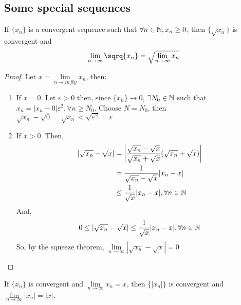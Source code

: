\subsection{Some special sequences}

\begin{theorem}
    If $\{x_n\}$ is a convergent sequence such that $\forall n \in \mathbb{N}, x_n \geq 0$, then $\{\sqrt{x_n}\}$ is convergent and
    \begin{equation}
        \lim \limits_{n \to \infty} \sqrq{x_n} = \sqrt{\lim \limits_{n \to \infty} x_n}
    \end{equation}
\end{theorem}

\begin{proof}
    Let $x = \lim \limits_{n \to infty} x_n$, then:
    \begin{enumerate}
        \item If $x = 0$. Let $\varepsilon > 0$ then, since $\{x_n\} \to 0$, $\exists N_0 \in \mathbb{N}$ such that $x_n = |x_n-0| \varepsilon^2, \forall n \geq N_0$. Choose $N = N_0$, then $\sqrt{x_n}-\sqrt{0} = \sqrt{x_n} < \sqrt{\varepsilon^2} = \varepsilon$
        \item If $ x > 0$. Then, 
        \begin{equation*}
            \begin{align}
                |\sqrt{x_n} - \sqrt{x}| &= \left |
                    \frac{\sqrt{x_n}-\sqrt{x}}{\sqrt{x_n}+\sqrt{x}}(\sqrt{x_n}+\sqrt{x})
                \right | \\
                &= \frac{1}{\sqrt{x_n} - \sqrt{x}}|x_n-x| \\
                &\leq \frac{1}{\sqrt{x}}|x_n-x|, \forall n \in \mathbb{N}
            \end{align}
        \end{equation*}
        And,
        \begin{equation*}
            0 \leq |\sqrt{x_n}-\sqrt{x}| \leq \frac{1}{\sqrt{x}}|x_n-x|, \forall n \in \mathbb{N}
        \end{equation*}
        So, by the squeeze theorem, $\lim \limits_{n\to\infty} |\sqrt{x_n}-\sqrt{x}| = 0$
    \end{enumerate}
\end{proof}

\begin{theorem}
    If $\{x_n\}$ is convergent and $\lim \limits_{n\to\infty} x_n = x$, then $\{|x_n|\}$ is convergent and $\lim \limits_{n \to \infty} |x_n| = |x|$.
\end{theorem}

